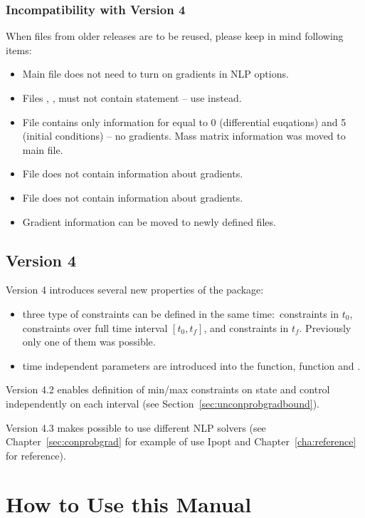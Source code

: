 \subsubsection*{Incompatibility with Version 4}
When files from older releases are to be reused, please keep in mind
following items:
\begin{itemize}
\item Main file does not need to turn on gradients in NLP options.
\item Files , ,  must
  not contain  statement -- use  instead. 
\item File  contains only information for 
  equal to 0 (differential euqations) and 5 (initial conditions) -- no
  gradients. Mass matrix information was moved to main file.
\item File  does not contain information about gradients.
\item File  does not contain information about gradients.
\item Gradient information can be moved to newly defined files.
\end{itemize}

\subsection*{Version 4}
Version 4 introduces several new properties of the package:
\begin{itemize}
\item three type of constraints can be defined in the same
  time:~constraints in $t_{0}$, constraints over full time interval 
  $[t_{0},t_{f}]$, and constraints in $t_{f}$. Previously only one of
  them was possible.
\item time independent parameters are introduced into the 
  function,  function and .
\end{itemize}
Version 4.2 enables definition of min/max constraints on state and
control independently on each interval (see
Section~\ref{sec:unconprobgradbound}).

Version 4.3 makes possible to use different NLP solvers (see
Chapter~\ref{sec:conprobgrad} for example of use Ipopt and
Chapter~\ref{cha:reference} for reference).

\section{How to Use this Manual}
\label{sec:howtouseman}

